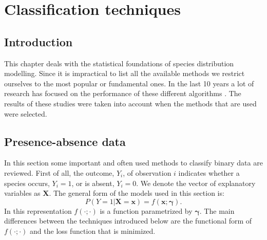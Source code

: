 \chapter{Classification techniques}
\label{ch:ClassificationTechniques}

\section{Introduction}
This chapter deals with the statistical foundations of species distribution modelling. Since it is impractical to list all the available methods we restrict ourselves to the most popular or fundamental ones. In the last 10 years a lot of research has focused on the performance of these different algorithms \parencite[e.g.][]{elith*_novel_2006,segurado_evaluation_2004}. The results of these studies were taken into account when the methods that are used were selected.

\section{Presence-absence data}
\label{sec:PresenceAbsenceData}

In this section some important and often used methods to classify binary data are reviewed. First of all, the outcome, $Y_i$, of observation $i$ indicates whether a species occurs, $Y_i = 1$, or is absent, $Y_i=0$. We denote the vector of explanatory variables as $\bm{X}$. The general form of the models used in this section is:
\begin{equation}
\label{FundEq}
P(Y=1|\bm{X} = \bm{x}) = f(\bm{x}; \bm{\gamma}).
\end{equation}
In this representation $f(\cdot;\cdot)$ is a function parametrized by $\bm{\gamma}$. The main differences between the techniques introduced below are the functional form of $f(\cdot;\cdot)$ and the loss function that is minimized.

